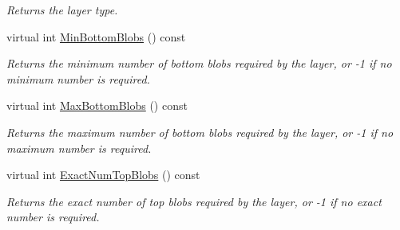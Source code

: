 \begin{DoxyCompactItemize}
\begin{DoxyCompactList}\small\item\em Returns the layer type. \end{DoxyCompactList}\item 
virtual int \mbox{\hyperlink{classcaffe_1_1_scale_layer_a12c10840f0fc3327854864a12054beb2}{Min\+Bottom\+Blobs}} () const
\begin{DoxyCompactList}\small\item\em Returns the minimum number of bottom blobs required by the layer, or -\/1 if no minimum number is required. \end{DoxyCompactList}\item 
virtual int \mbox{\hyperlink{classcaffe_1_1_scale_layer_a7867d035776f78fe486ce633ec0520ad}{Max\+Bottom\+Blobs}} () const
\begin{DoxyCompactList}\small\item\em Returns the maximum number of bottom blobs required by the layer, or -\/1 if no maximum number is required. \end{DoxyCompactList}\item 
virtual int \mbox{\hyperlink{classcaffe_1_1_scale_layer_aeffb8fcfc522f7365c23b0e6ae5c232e}{Exact\+Num\+Top\+Blobs}} () const
\begin{DoxyCompactList}\small\item\em Returns the exact number of top blobs required by the layer, or -\/1 if no exact number is required. \end{DoxyCompactList}\end{DoxyCompactItemize}
